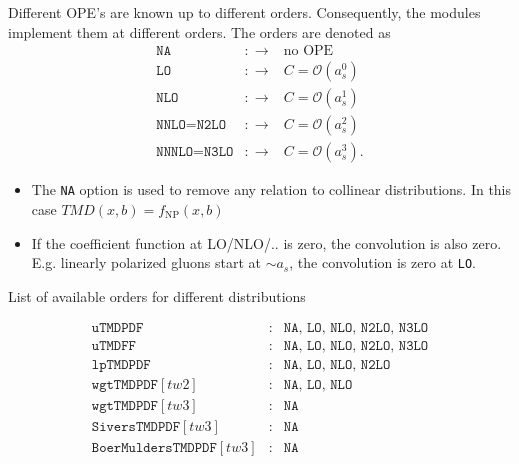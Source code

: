 \documentclass[prd,nofootinbib,eqsecnum,final]{revtex4}
\renewcommand{\(}{\left(}
\renewcommand{\)}{\right)}
\renewcommand{\[}{\left[}
\renewcommand{\]}{\right]}
\begin{document}
Different OPE's are known up to different orders. Consequently, the modules implement them at different orders. The orders are denoted as
\begin{eqnarray*}
\texttt{NA}&:\to & \text{no OPE}
\\
\texttt{LO}&:\to & C=\mathcal{O}(a_s^0)
\\
\texttt{NLO}&:\to & C=\mathcal{O}(a_s^1)
\\
\texttt{NNLO}=\texttt{N2LO}&:\to & C=\mathcal{O}(a_s^2)
\\
\texttt{NNNLO}=\texttt{N3LO}&:\to & C=\mathcal{O}(a_s^3).
\end{eqnarray*}
\begin{itemize}
\item The \texttt{NA} option is used to remove any relation to collinear distributions. In this case $TMD(x,b)=f_{\text{NP}}(x,b)$
\item If the coefficient function at LO/NLO/.. is zero, the convolution is also zero. E.g. linearly polarized gluons start at $\sim a_s$, the convolution is zero at \texttt{LO}. 
\end{itemize}
\begin{center}
List of available orders for different distributions
\end{center}
\begin{eqnarray*}
\texttt{uTMDPDF}&:& \texttt{NA, LO, NLO, N2LO, N3LO}
\\
\texttt{uTMDFF}&:& \texttt{NA, LO, NLO, N2LO, N3LO}
\\
\texttt{lpTMDPDF}&:& \texttt{NA, LO, NLO, N2LO}
\\
\texttt{wgtTMDPDF}[tw2]&:& \texttt{NA, LO, NLO}
\\
\texttt{wgtTMDPDF}[tw3]&:& \texttt{NA}
\\
\texttt{SiversTMDPDF}[tw3]&:& \texttt{NA}
\\
\texttt{BoerMuldersTMDPDF}[tw3]&:& \texttt{NA}
\end{eqnarray*}
\end{document}
